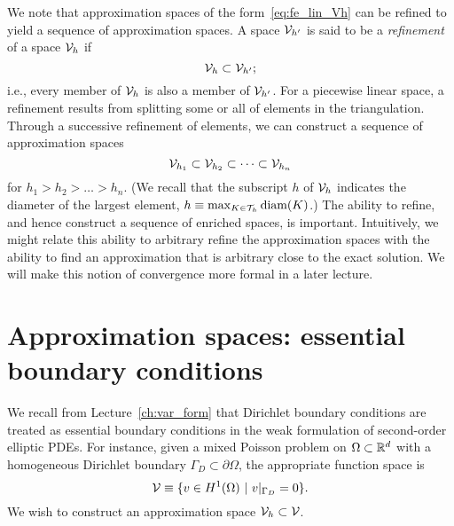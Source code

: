 We note that approximation spaces of the form~\eqref{eq:fe_lin_Vh} can be refined to yield a sequence of approximation spaces. A space $\mathcal{V}_{h'}$ is said to be a \emph{refinement} of a space $\mathcal{V}_h$ if
\begin{equation*}
  \mathcal{V}_h \subset \mathcal{V}_{h'};
\end{equation*}
i.e., every member of $\mathcal{V}_h$ is also a member of $\mathcal{V}_{h'}$. For a piecewise linear space, a refinement results from splitting some or all of elements in the triangulation.  Through a successive refinement of elements, we can construct a sequence of approximation spaces
\begin{equation*}
  \mathcal{V}_{h_1} \subset \mathcal{V}_{h_2} \subset \cdots \subset \mathcal{V}_{h_n}
\end{equation*}
for $h_1 > h_2 > \dots > h_n$. (We recall that the subscript $h$ of $\mathcal{V}_h$ indicates the diameter of the largest element, $h \equiv \max_{K \in \mathcal{T}_h} \text{diam}(K)$.)  The ability to refine, and hence construct a sequence of enriched spaces, is important. Intuitively, we might relate this ability to arbitrary refine the approximation spaces with the ability to find an approximation that is arbitrary close to the exact solution.  We will make this notion of convergence more formal in a later lecture.

\section{Approximation spaces: essential boundary conditions}
We recall from Lecture~\ref{ch:var_form} that Dirichlet boundary conditions are treated as essential boundary conditions in the weak formulation of second-order elliptic PDEs.  For instance, given a mixed Poisson problem on $\Omega \subset \mathbb{R}^d$ with a homogeneous Dirichlet boundary $\Gamma_D \subset \partial \Omega$, the appropriate function space is
\begin{equation*}
  \mathcal{V} \equiv \{ v \in H^1(\Omega) \ | \ v|_{\Gamma_D} = 0 \}.
\end{equation*}
We wish to construct an approximation space $\mathcal{V}_h \subset \mathcal{V}$.

